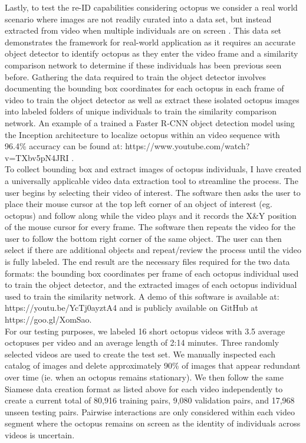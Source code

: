 \documentclass[11pt]{article}
\begin{document}
\noindent
Lastly, to test the re-ID capabilities considering octopus we consider a real world scenario where images are not readily curated into a data set, but instead extracted from video when multiple individuals are on screen \cite{scheel2017second}. This data set demonstrates the framework for real-world application as it requires an accurate object detector to identify octopus as they enter the video frame and a similarity comparison network to determine if these individuals has been previous seen before. Gathering the data required to train the object detector involves documenting the bounding box coordinates for each octopus in each frame of video to train the object detector as well as extract these isolated octopus images into labeled folders of unique individuals to train the similarity comparison network. An example of a trained a Faster R-CNN object detection model using the Inception architecture to localize octopus within an video sequence with 96.4\% accuracy can be found at: https://www.youtube.com/watch?v=TXbv5pN4JRI \cite{schneider2018deep}.
\newline
\\
To collect bounding box and extract images of octopus individuals, I have created a universally applicable video data extraction tool to streamline the process. The user begins by selecting their video of interest. The software then asks the user to place their mouse cursor at the top left corner of an object of interest (eg. octopus) and follow along while the video plays and it records the X\&Y position of the mouse cursor for every frame. The software then repeats the video for the user to follow the bottom right corner of the same object. The user can then select if there are additional objects and repeat/review the process until the video is fully labeled. The end result are the necessary files required for the two data formats: the bounding box coordinates per frame of each octopus individual used to train the object detector, and the extracted images of each octopus individual used to train the similarity network. A demo of this software is available at: https://youtu.be/YcTj0ayztA4 and is publicly available on GitHub at https://goo.gl/XomSao. 
\newline
\\
For our testing purposes, we labeled 16 short octopus videos with 3.5 average octopuses per video and an average length of 2:14 minutes. Three randomly selected videos are used to create the test set. We manually inspected each catalog of images and delete approximately 90\% of images that appear redundant over time (ie. when an octopus remains stationary). We then follow the same Siamese data creation format as listed above for each video independently to create a current total of 80,916 training pairs, 9,080 validation pairs, and 17,968 unseen testing pairs. Pairwise interactions are only considered within each video segment where the octopus remains on screen as the identity of individuals across videos is uncertain.
\end{document}
